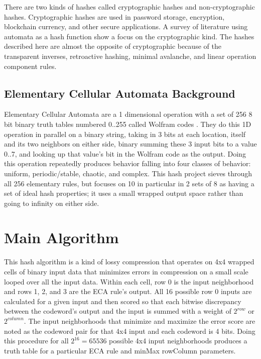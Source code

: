 \documentclass[11pt]{article}
\begin{document}
There are two kinds of hashes called cryptographic hashes and non-cryptographic hashes. Cryptographic hashes are used in password storage, encryption, blockchain currency, and other secure applications. A survey of literature using automata as a hash function show a focus on the cryptographic kind. \cite{app14219719} \cite{article} \cite{Rajeshwaran2019CellularAB} The hashes described here are almost the opposite of cryptographic because of the transparent inverses, retroactive hashing, minimal avalanche, and linear operation component rules.\\

\subsection{Elementary Cellular Automata Background}

Elementary Cellular Automata are a 1 dimensional operation with a set of 256 8 bit binary truth tables numbered 0..255 called Wolfram codes \cite{Wolfram}. They do this 1D operation in parallel on a binary string, taking in 3 bits at each location, itself and its two neighbors on either side, binary summing these 3 input bits to a value 0..7, and looking up that value's bit in the Wolfram code as the output. Doing this operation repeatedly produces behavior falling into four classes of behavior: uniform, periodic/stable, chaotic, and complex. This hash project sieves through all 256 elementary rules, but focuses on 10 in particular in 2 sets of 8 as having a set of ideal hash properties; it uses a small wrapped output space rather than going to infinity on either side.

\section{Main Algorithm}
This hash algorithm is a kind of lossy compression that operates on 4x4 wrapped cells of binary input data that minimizes errors in compression on a small scale looped over all the input data. Within each cell, row 0 is the input neighborhood and rows 1, 2, and 3 are the ECA rule's output. All 16 possible row 0 inputs are calculated for a given input and then scored so that each bitwise discrepancy between the codeword's output and the input is summed with a weight of $2^{row}$ or $2^{column}$. The input neighborhoods that minimize and maximize the error score are noted as the codeword pair for that 4x4 input and each codeword is 4 bits. Doing this procedure for all  $2^{16}=65536$ possible 4x4 input neighborhoods produces a truth table for a particular ECA rule and minMax rowColumn parameters.\\
\end{document}

